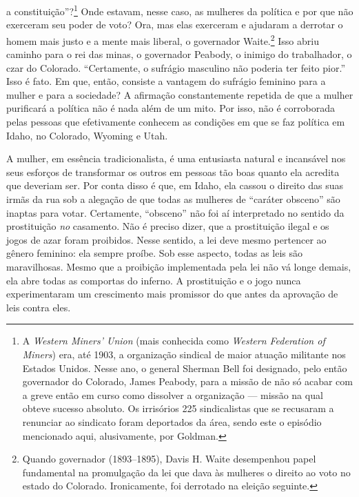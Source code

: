 a constituição''?\footnote{A \emph{Western Miners' Union} (mais conhecida como \emph{Western Federation of Miners}) era, até 1903, a organização sindical de maior atuação militante nos Estados Unidos. Nesse ano, o general Sherman Bell foi designado, pelo então governador do Colorado, James Peabody, para a missão de não só acabar com a greve então em curso como dissolver a organização --- missão na qual obteve sucesso absoluto. Os irrisórios 225 sindicalistas que se recusaram a renunciar ao sindicato foram deportados da área, sendo este o episódio mencionado aqui, alusivamente, por Goldman.} Onde estavam, nesse caso, as mulheres da política e
por que não exerceram seu poder de voto? Ora, mas elas exerceram e
ajudaram a derrotar o homem mais justo e a mente mais liberal, o
governador Waite.\footnote{Quando governador (1893--1895), Davis H. Waite desempenhou papel fundamental na
  promulgação da lei que dava às mulheres o direito ao voto no estado do
  Colorado. Ironicamente, foi derrotado na eleição seguinte.} Isso abriu
caminho para o rei das minas, o governador Peabody, o inimigo do
trabalhador, o czar do Colorado. ``Certamente, o sufrágio masculino não
poderia ter feito pior.'' Isso é fato. Em que, então, consiste a
vantagem do sufrágio feminino para a mulher e para a sociedade? A
afirmação constantemente repetida de que a mulher purificará a política
não é nada além de um mito. Por isso, não é corroborada pelas pessoas
que efetivamente conhecem as condições em que se faz política em Idaho,
no Colorado, Wyoming e Utah.

A mulher, em essência tradicionalista, é uma entusiasta natural e
incansável nos seus esforços de transformar os outros em pessoas tão
boas quanto ela acredita que deveriam ser. Por conta disso é que, em
Idaho, ela cassou o direito das suas irmãs da rua sob a alegação de que
todas as mulheres de ``caráter obsceno'' são inaptas para votar.
Certamente, ``obsceno'' não foi aí interpretado no sentido da
prostituição \emph{no} casamento. Não é preciso dizer, que a
prostituição ilegal e os jogos de azar foram proibidos. Nesse sentido, a
lei deve mesmo pertencer ao gênero feminino: ela sempre proíbe. Sob esse
aspecto, todas as leis são maravilhosas. Mesmo que a proibição
implementada pela lei não vá longe demais, ela abre todas as comportas
do inferno. A prostituição e o jogo nunca experimentaram um crescimento
mais promissor do que antes da aprovação de leis contra eles.

